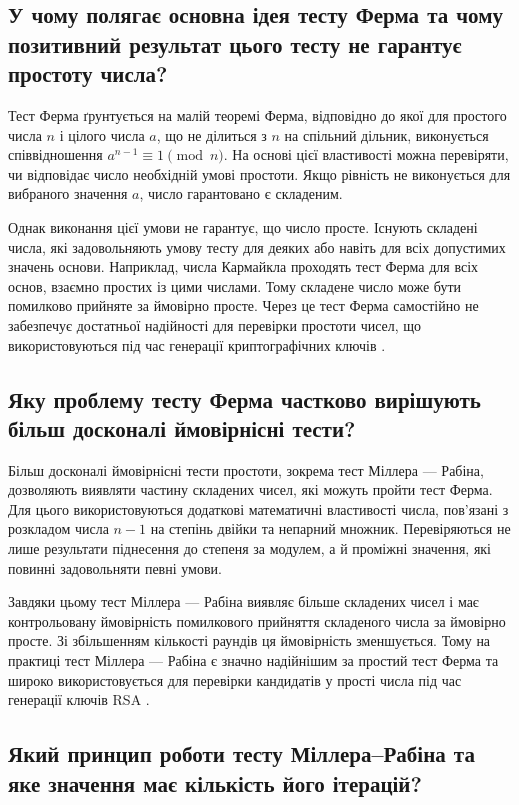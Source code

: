 \subsection{У чому полягає основна ідея тесту Ферма та чому позитивний результат цього тесту не гарантує простоту числа?}

Тест Ферма ґрунтується на малій теоремі Ферма, відповідно до якої для простого числа $n$ і цілого числа $a$, 
що не ділиться з $n$ на спільний дільник, виконується співвідношення $a^{n-1}\equiv 1 \pmod n$. 
На основі цієї властивості можна перевіряти, чи відповідає число необхідній умові простоти. 
Якщо рівність не виконується для вибраного значення $a$, число гарантовано є складеним.

Однак виконання цієї умови не гарантує, що число просте. Існують складені числа, 
які задовольняють умову тесту для деяких або навіть для всіх допустимих значень основи. 
Наприклад, числа Кармайкла проходять тест Ферма для всіх основ, взаємно простих із цими числами. 
Тому складене число може бути помилково прийняте за ймовірно просте. Через це тест Ферма самостійно 
не забезпечує достатньої надійності для перевірки простоти чисел, що використовуються під час генерації криптографічних ключів \cite{FermatTest}.

\subsection{Яку проблему тесту Ферма частково вирішують більш досконалі ймовірнісні тести?}

Більш досконалі ймовірнісні тести простоти, зокрема тест Міллера — Рабіна, дозволяють виявляти частину складених чисел, які можуть пройти тест Ферма. Для цього використовуються додаткові математичні властивості числа, пов'язані з розкладом числа $n-1$ на степінь двійки та непарний множник. Перевіряються не лише результати піднесення до степеня за модулем, а й проміжні значення, які повинні задовольняти певні умови.

Завдяки цьому тест Міллера — Рабіна виявляє більше складених чисел і має контрольовану ймовірність помилкового прийняття складеного числа за ймовірно просте. Зі збільшенням кількості раундів ця ймовірність зменшується. Тому на практиці тест Міллера — Рабіна є значно надійнішим за простий тест Ферма та широко використовується для перевірки кандидатів у прості числа під час генерації ключів RSA \cite{MillerRabin,Rabin}.

\subsection{Який принцип роботи тесту Міллера--Рабіна та яке значення має кількість його ітерацій?}

